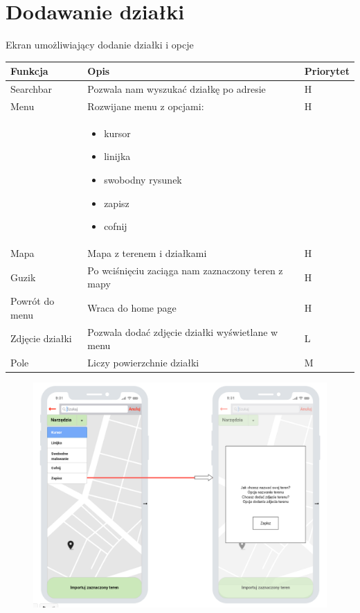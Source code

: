 \newpage
\section{Dodawanie działki}
Ekran umożliwiający dodanie działki i opcje
\begin{table}[H]
    \begin{center}
    \label{tab:table}
    \begin{tabularx}{1.1\textwidth} { 
    >{\raggedright\arraybackslash}X 
    | >{\raggedright\arraybackslash}X 
    | >{\raggedleft\arraybackslash}X}
    \textbf{Funkcja} & \textbf{Opis} & \textbf{Priorytet}\\
    \hline
    Searchbar&Pozwala nam wyszukać działkę po adresie&H\\
    \hline
    Menu&Rozwijane menu z opcjami:&H\\
    &\begin{itemize}
    \item kursor
  	\item linijka
  	\item swobodny rysunek
  	\item zapisz
  	\item cofnij
	\end{itemize}&\\
	\hline
    Mapa&Mapa z terenem i działkami&H\\
    \hline
    Guzik&Po wciśnięciu zaciąga nam zaznaczony teren z mapy&H\\
    \hline
    Powrót do menu&Wraca do home page&H\\
    \hline
    Zdjęcie działki&Pozwala dodać zdjęcie działki wyświetlane w menu&L\\
    \hline
    Pole&Liczy powierzchnie działki&M\\
    \hline
    \end{tabularx}
    \end{center}
    \end{table}
    \begin{figure}[htp]
      \centering
      \includegraphics[width=15cm]{cipsko4.png}
  \end{figure}    